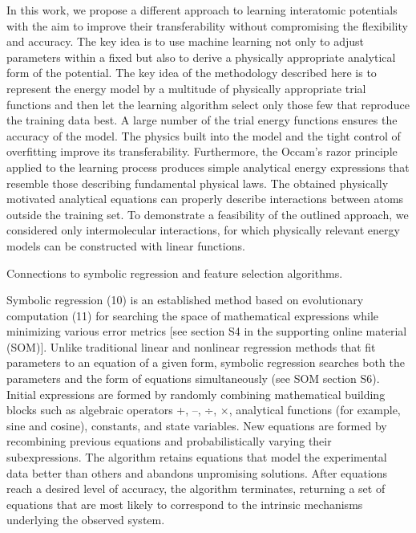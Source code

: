 \documentclass[aps,prl,reprint,amsmath,amssymb,nature]{revtex4-1}
\begin{document}

In this work, we propose a different approach to learning interatomic potentials with the aim to improve their transferability without compromising the flexibility and accuracy. 
The key idea is to use machine learning not only to adjust parameters within a fixed but also to derive a physically appropriate analytical form of the potential.
The key idea of the methodology described here is to represent the energy model by a multitude of physically appropriate trial functions and then let the learning algorithm select only those few that reproduce the training data best. 
A large number of the trial energy functions ensures the accuracy of the model. 
The physics built into the model and the tight control of overfitting improve its transferability. 
Furthermore, the Occam's razor principle applied to the learning process produces simple analytical energy expressions that resemble those describing fundamental physical laws. 
The obtained physically motivated analytical equations can properly describe interactions between atoms outside the training set. 
To demonstrate a feasibility of the outlined approach, we considered only intermolecular interactions, for which physically relevant energy models can be constructed with linear functions.

Connections to symbolic regression and feature selection algorithms.

Symbolic regression (10) is an established method based on evolutionary computation (11) for searching the space of mathematical expressions while minimizing various error metrics [see section S4 in the supporting online material (SOM)]. Unlike traditional linear and nonlinear regression methods that fit parameters to an equation of a given form, symbolic regression searches both the parameters and the form of equations simultaneously (see SOM section S6). Initial expressions are formed by randomly combining mathematical building blocks such as algebraic operators {+, –, ÷, ×}, analytical functions (for example, sine and cosine), constants, and state variables. New equations are formed by recombining previous equations and probabilistically varying their subexpressions. The algorithm retains equations that model the experimental data better than others and abandons unpromising solutions. After equations reach a desired level of accuracy, the algorithm terminates, returning a set of equations that are most likely to correspond to the intrinsic mechanisms underlying the observed system.
\end{document}
